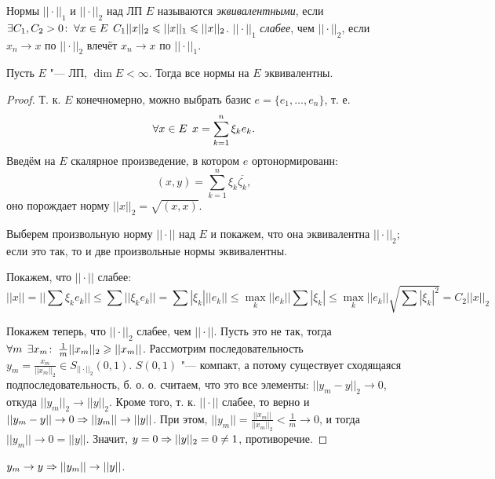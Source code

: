 \documentclass[main]{subfiles}
\begin{document}
\begin{definition}
  Нормы \( ||\cdot||_1 \) и \( ||\cdot||_2 \) над ЛП \( E \)
  называются \emph{эквивалентными}, если
  \( \exists C_1, C_2 > 0 \colon \: \forall {x \in E} \; \, C_1 ||x||_2 \leqslant ||x||_1 \leqslant ||x||_2 \).
  \( ||\cdot||_1 \) \emph{слабее}, чем \( ||\cdot||_2 \),
  если \( x_n \to x \) по \( ||\cdot||_2 \) влечёт
  \( x_n \to x \) по \( ||\cdot||_1 \).
\end{definition}

\begin{proposition}
  Пусть \( E \) "--- ЛП, \( \dim E < \infty \). Тогда все нормы на
  \( E \) эквивалентны.
\end{proposition}
\begin{proof}
  Т. к. \( E \) конечномерно, можно выбрать базис
  \( e = \{ e_1, \dots, e_n \} \), т. е.
  \[ \forall {x \in E} \; \, x = \sum_{k = 1}^n \xi_k e_k. \]
  Введём на \( E \) скалярное произведение, в котором
  \( e \) ортонормированн:
  \[ (x, y) = \sum_{k = 1}^n \xi_k \overline{\zeta_k}, \]
  оно порождает норму \( ||x||_2 = \sqrt{(x, x)} \).

  Выберем произвольную норму \( ||\cdot|| \) над \( E \)
  и покажем, что она эквивалентна \( ||\cdot||_2 \);
  если это так, то и две произвольные нормы эквивалентны.

  Покажем, что \( ||\cdot|| \) слабее:
  \[ ||x|| = ||\sum \xi_k e_k|| \le \sum ||\xi_k e_k|| =
  \sum |\xi_k| ||e_k|| \le \max_k ||e_k|| \sum |\xi_k| \le
  \max_k ||e_k|| \sqrt{\sum |\xi_k|^2} = C_2 ||x||_2 \]

  Покажем теперь, что \( ||\cdot||_2 \) слабее, чем \( ||\cdot|| \).
  Пусть это не так, тогда
  \( \forall {m} \; \, \exists x_m \colon \: \frac{1}{m} ||x_m||_2 \geqslant ||x_m|| \).
  Рассмотрим последовательность 
  \( y_m = \frac{x_m}{||x_m||_2} \in S_{||\cdot||_2}(0, 1) \).
  \( S(0, 1) \) "--- компакт, а потому существует сходящаяся подпоследовательность,
  б. о. о. считаем, что это все элементы: \( ||y_m - y||_2 \to 0 \),
  откуда \( ||y_m||_2 \to ||y||_2 \). Кроме того, т. к. \( ||\cdot|| \) слабее,
  то верно и \( ||y_m - y|| \to 0 \Rightarrow ||y_m|| \to ||y|| \).
  При этом, \( ||y_m|| = \frac{||x_m||}{||x_m||_2} < \frac{1}{m} \to 0 \),
  и тогда \( ||y_m|| \to 0 = ||y|| \). Значит, \( y = 0 \Rightarrow ||y||_2 = 0 \ne 1 \),
  противоречие.
\end{proof}

\begin{exercise}
  \( y_m \to y \Rightarrow ||y_m|| \to ||y|| \).
\end{exercise}
\end{document}
